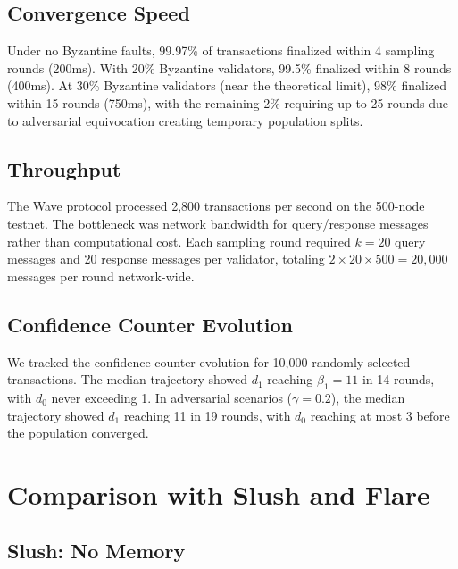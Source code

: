 \documentclass[11pt,a4paper]{article}
\begin{document}
\subsection{Convergence Speed}

Under no Byzantine faults, 99.97\% of transactions finalized within 4 sampling rounds
(200ms). With 20\% Byzantine validators, 99.5\% finalized within 8 rounds (400ms).
At 30\% Byzantine validators (near the theoretical limit), 98\% finalized within 15
rounds (750ms), with the remaining 2\% requiring up to 25 rounds due to adversarial
equivocation creating temporary population splits.

\subsection{Throughput}

The Wave protocol processed 2,800 transactions per second on the 500-node testnet.
The bottleneck was network bandwidth for query/response messages rather than computational
cost. Each sampling round required $k = 20$ query messages and 20 response messages per
validator, totaling $2 \times 20 \times 500 = 20{,}000$ messages per round network-wide.

\subsection{Confidence Counter Evolution}

We tracked the confidence counter evolution for 10,000 randomly selected transactions.
The median trajectory showed $d_1$ reaching $\beta_1 = 11$ in 14 rounds, with $d_0$
never exceeding 1. In adversarial scenarios ($\gamma = 0.2$), the median trajectory
showed $d_1$ reaching 11 in 19 rounds, with $d_0$ reaching at most 3 before the population
converged.

\section{Comparison with Slush and Flare}
\label{sec:comparison}

\subsection{Slush: No Memory}
\end{document}
